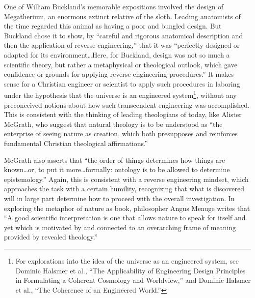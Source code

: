 One of William Buckland’s memorable expositions involved the design of
Megatherium, an enormous extinct relative of the
sloth.\citep[][pg. 245]{roberts1999}
Leading anatomists of the time regarded this
animal as having a poor and bungled design. But Buckland chose it to
show, by “careful and rigorous anatomical description and then the
application of reverse engineering,” that it was “perfectly designed or
adapted for its environment…Here, for Buckland, design was not so much
a scientific theory, but rather a metaphysical or theological outlook,
which gave confidence or grounds for applying reverse engineering
procedures.”\citep[][pg. 248]{roberts1999}
It makes sense for a Christian
engineer or scientist to apply such procedures in laboring under the
hypothesis that the universe is an engineered
system\footnote{
For explorations into the idea of the universe as an
engineered system, see Dominic Halsmer et al., “The Applicability of
Engineering Design Principles in Formulating a Coherent Cosmology and
Worldview,”\citep{halsmeretal2008} and Dominic Halsmer et al., “The Coherence of an
Engineered World.”\citep{halsmeretal2009b}
}, without any preconceived notions about how
such transcendent engineering was accomplished. This is consistent with
the thinking of leading theologians of today, like Alister McGrath, who
suggest that natural theology is to be understood as “the enterprise of
seeing nature as creation, which both presupposes and reinforces
fundamental Christian theological affirmations.”\citep[][pg. 64]{mcgrath2006}


McGrath also asserts that “the order of things determines how things are
known…or, to put it more…formally: ontology is to be allowed to
determine epistemology.”\citep[][pgs. xv--xvi]{mcgrath2006} Again, this is consistent
with a reverse engineering mindset, which approaches the task with a
certain humility, recognizing that what is discovered will in large
part determine how to proceed with the overall investigation. In
exploring the metaphor of nature as book, philosopher Angus Menuge
writes that “A good scientific interpretation is one that allows nature
to speak for itself and yet which is motivated by and connected to an
overarching frame of meaning provided by revealed
theology.”\citep[][pg. 96]{menuge2003}

